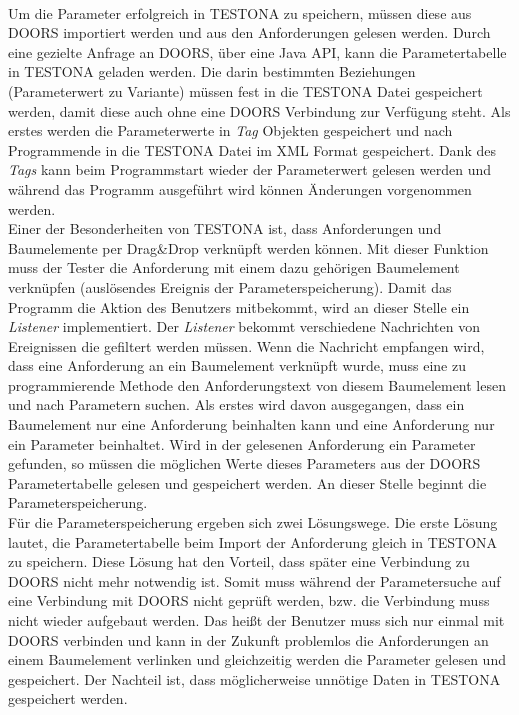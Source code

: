 \paragraph{}
 
Um die Parameter erfolgreich in TESTONA zu speichern, müssen diese aus DOORS importiert werden und aus den Anforderungen gelesen werden. Durch eine gezielte Anfrage an DOORS, über eine Java API, kann die Parametertabelle in TESTONA geladen werden. Die darin bestimmten Beziehungen (Parameterwert zu Variante) müssen fest in die TESTONA Datei gespeichert werden, damit diese auch ohne eine DOORS Verbindung zur Verfügung steht. Als erstes werden die Parameterwerte in \textit{Tag} Objekten gespeichert und nach Programmende in die TESTONA Datei im XML Format gespeichert. Dank des \textit{Tags} kann beim Programmstart wieder der Parameterwert gelesen werden und während das Programm ausgeführt wird können Änderungen vorgenommen werden.\\


Einer der Besonderheiten von TESTONA ist, dass Anforderungen und Baumelemente per Drag\&Drop verknüpft werden können. Mit dieser Funktion muss der Tester die Anforderung mit einem dazu gehörigen Baumelement verknüpfen (auslösendes Ereignis der Parameterspeicherung). Damit das Programm die Aktion des Benutzers mitbekommt, wird an dieser Stelle ein \textit{Listener} implementiert. Der \textit{Listener} bekommt verschiedene Nachrichten von Ereignissen die gefiltert werden müssen. Wenn die Nachricht empfangen wird, dass eine Anforderung an ein Baumelement verknüpft wurde, muss eine zu programmierende Methode den Anforderungstext von diesem Baumelement lesen und nach Parametern suchen. Als erstes wird davon ausgegangen, dass ein Baumelement nur eine Anforderung beinhalten kann und eine Anforderung nur ein Parameter beinhaltet. Wird in der gelesenen Anforderung ein Parameter gefunden, so müssen die möglichen Werte dieses Parameters aus der DOORS Parametertabelle gelesen und gespeichert werden. An dieser Stelle beginnt die Parameterspeicherung.\\


Für die Parameterspeicherung ergeben sich zwei Lösungswege. Die erste Lösung lautet, die Parametertabelle beim Import der Anforderung gleich in TESTONA zu speichern. Diese Lösung hat den Vorteil, dass später eine Verbindung zu DOORS nicht mehr notwendig ist. Somit muss während der Parametersuche auf eine Verbindung mit DOORS nicht geprüft werden, bzw. die Verbindung muss nicht wieder aufgebaut werden. Das heißt der Benutzer muss sich nur einmal mit DOORS verbinden und kann in der Zukunft problemlos die Anforderungen an einem Baumelement verlinken und gleichzeitig werden die Parameter gelesen und gespeichert. Der Nachteil ist, dass möglicherweise unnötige Daten in TESTONA gespeichert werden.\\


